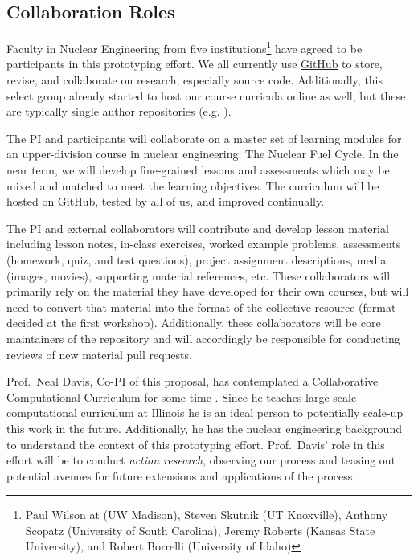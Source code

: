 \documentclass[11pt]{article}
\begin{document}
          \subsection{Collaboration Roles}
          Faculty in Nuclear Engineering from five institutions\footnote{
          Paul Wilson at (UW Madison), 
          Steven Skutnik (UT Knoxville), 
          Anthony Scopatz (University of South Carolina), 
          Jeremy Roberts (Kansas State University), 
          and Robert Borrelli (University of Idaho)
          } have agreed to be participants in 
          this prototyping effort. We all currently use 
          \href{https://github.com}{GitHub} to store, 
          revise, and collaborate on research, especially source code. 
          Additionally, this select group already started to host our course 
          curricula online as well, but these are typically single author 
          repositories (e.g. \cite{huff_npre412_2017}).

          The PI and participants will collaborate on a master set of learning 
          modules for an upper-division course in nuclear engineering: 
          The Nuclear Fuel Cycle. In the near term, we will develop 
          fine-grained lessons and assessments which may be mixed and matched 
          to meet the learning objectives. The curriculum will be hosted on 
          GitHub, tested by all of us, and improved continually.
          
          The PI and external collaborators will contribute and develop lesson 
          material including lesson notes, in-class exercises, worked example 
          problems, assessments (homework, quiz, and test questions), project 
          assignment descriptions, media (images, movies), supporting material 
          references, etc. These collaborators will primarily rely on the 
          material they have developed for their own courses, but will need to 
          convert that material into the format of the collective resource 
          (format decided at the first workshop). Additionally, these 
          collaborators will be core maintainers of the repository and will 
          accordingly be responsible for conducting reviews of new material 
          pull requests.

          Prof.~Neal Davis, Co-PI of this proposal, has contemplated a 
          Collaborative Computational Curriculum for some time 
          \cite{davis_university_2016}. Since he 
          teaches large-scale 
          computational curriculum at Illinois 
          he is an ideal person to potentially scale-up this work in the 
          future. Additionally, he has the nuclear engineering background to 
          understand the context of this prototyping effort. Prof.~Davis' role 
          in this effort will be to conduct \emph{action research}, observing 
          our process and teasing out potential avenues for future 
          extensions and applications of the process. 
\end{document}
